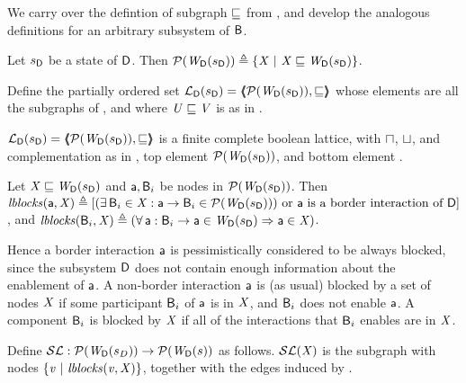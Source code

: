 We carry over the defintion of subgraph $\subg$ from , and develop the analogous definitions for an arbitrary subsystem
of $\B$.


\begin{definition} \label{defn:wsetOfSubgraphsLoc}
Let $\sD$ be a state of $\DS$. Then 
$\lwfgS{B}{\sD}{\DS} \df  \set{ \XS \stt \XS \subg \lwfg{B}{\sD}{\DS} }$.
\end{definition}

\begin{definition} \label{defn:wflatticeLoc}
Define the partially ordered set 
$\llat{\B}{\sD}{\DS}  = \tpl{ \lwfgS{B}{\sD}{\DS},  \subg }$ 
whose elements are all the subgraphs of 
, and where  $\US \subg \VS$ is as in .   
\end{definition}

\begin{proposition} \label{prop:isALatticeLoc}
$\llat{\B}{\sD}{\DS}  = \tpl{ \lwfgS{B}{\sD}{\DS},  \subg }$
 is a finite complete boolean lattice, with $\meet$, $\join$, and complementation as in 
, top element $\lwfgS{B}{\sD}{\DS}$, and bottom element \ewfg.
\end{proposition}

\begin{definition} \label{defn:blocksLoc}
Let $\XS \subg \lwfg{\B}{\sD}{\DS}$ and $\act, \B_i$ be nodes in $\lwfgS{B}{\sD}{\DS}$. Then 
$\lblocks{\act}{\XS} \df
[ (\ex \B_i \in \XS : \act \ar \B_i \in \lwfgS{B}{\sD}{\DS})
   \mbox{ or $\act$ is a border interaction of $\DS$} ]$, and 
$\lblocks{\B_i}{\XS} \df (\fa \act : \B_i \ar \act \in \lwfg{B}{\sD}{\DS} \imp \act \in \XS)$.
\end{definition}
Hence a border interaction $\act$ is pessimistically considered to be always blocked, since
the subsystem $\DS$ does not contain enough information about the enablement of $\act$.
A non-border interaction $\act$ is (as usual) blocked by a set of nodes $\XS$ if some participant $\B_i$ of 
$\act$ is in $\XS$, and $\B_i$ does not enable $\act$.
A component $\B_i$ is blocked by $\XS$ if all of the interactions that $\B_i$ enables are in $\XS$.


\begin{definition}[$\lSFs$] \label{defn:scFixLoc}
Define $\lSFs:  \lwfgS{B}{s_D}{\DS}  \to  \lwfgS{B}{s}{\DS}$ as follows.
$\lSF{\XS}$ is the subgraph with nodes $\set{\ndv \stt \lblocks{\ndv}{\XS} }$, together with the edges induced by .
\end{definition}

